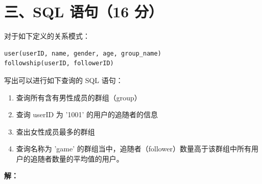 \documentclass[11pt,a4paper]{article}
\newcommand{\solution}{\par\noindent\textcolor{ansblue}{\textbf{解：}}}
\begin{document}
\newpage
\section*{三、SQL 语句（16 分）}

对于如下定义的关系模式：

\begin{verbatim}
user(userID, name, gender, age, group_name)
followship(userID, followerID)
\end{verbatim}

写出可以进行如下查询的 SQL 语句：

\begin{enumerate}[label=(\arabic*),leftmargin=*]
  \item 查询所有含有男性成员的群组（group）
  \item 查询 userID 为 '1001' 的用户的追随者的信息
  \item 查出女性成员最多的群组
  \item 查询名称为 'game' 的群组当中，追随者（follower）数量高于该群组中所有用户的追随者数量的平均值的用户。
\end{enumerate}

\solution
\end{document}
